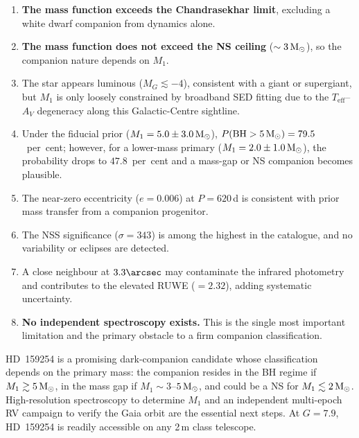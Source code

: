 \documentclass[usenatbib,fleqn]{mnras}
\newcommand{\Msun}{{\rm M}_\odot}
\begin{document}
\begin{enumerate}
\item \textbf{The mass function exceeds the Chandrasekhar limit},
  excluding a white dwarf companion from dynamics alone.

\item \textbf{The mass function does not exceed the NS ceiling}
  ($\sim 3\,\Msun$), so the companion nature depends on $M_1$.

\item The star appears luminous ($M_G \lesssim -4$),
  consistent with a giant or supergiant, but $M_1$ is only
  loosely constrained by broadband SED fitting due to the
  $T_\mathrm{eff}$--$A_V$ degeneracy along this
  Galactic-Centre sightline.

\item Under the fiducial prior ($M_1 = 5.0 \pm 3.0\,\Msun$),
  $P(\text{BH} > 5\,\Msun) = 79.5$~per~cent; however, for a
  lower-mass primary ($M_1 = 2.0 \pm 1.0\,\Msun$), the
  probability drops to $47.8$~per~cent and a mass-gap or NS
  companion becomes plausible.

\item The near-zero eccentricity ($e = 0.006$) at $P = 620$\,d
  is consistent with prior mass transfer from a companion
  progenitor.

\item The NSS significance ($\sigma = 343$) is among the highest
  in the catalogue, and no variability or eclipses are detected.

\item A close neighbour at $3.3\arcsec$ may contaminate the
  infrared photometry and contributes to the elevated
  RUWE ($= 2.32$), adding systematic uncertainty.

\item \textbf{No independent spectroscopy exists.}  This is
  the single most important limitation and the primary obstacle
  to a firm companion classification.
\end{enumerate}

HD~159254 is a promising dark-companion candidate whose
classification depends on the primary mass: the companion
resides in the BH regime if $M_1 \gtrsim 5\,\Msun$, in the
mass gap if $M_1 \sim 3$--$5\,\Msun$, and could be a NS for
$M_1 \lesssim 2\,\Msun$.  High-resolution spectroscopy to
determine $M_1$ and an independent multi-epoch RV campaign to
verify the Gaia orbit are the essential next steps.  At
$G = 7.9$, HD~159254 is readily accessible on any 2\,m class
telescope.
\end{document}

